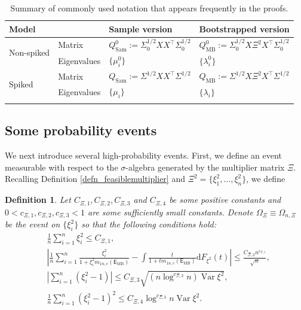 \documentclass[12pt]{article}
\theoremstyle{plain}
\newtheorem{definition}{Definition}[section]
\numberwithin{equation}{section}
\begin{document}
\begin{table}[!ht]
	\centering
	\captionsetup{justification=centering,singlelinecheck=true}
	\begin{tabular}{llll}
		\toprule
		Model           &   &Sample version & Bootstrapped version\\ \midrule
		\multirow{2}{*}{Non-spiked} & Matrix & $Q_{\mathrm{Sam}}^0:=\Sigma_0^{1/2}XX^\top \Sigma_0^{1/2}$ & $Q_{\mathrm{MB}}^0:=\Sigma_0^{1/2}X\Xi^2X^\top\Sigma_0^{1/2}$\\ \cmidrule(l){3-4} 
		& Eigenvalues & $\{\mu^0_i\}$ &  $\{\lambda^0_i\}$ \\ \midrule
		\multirow{2}{*}{Spiked} &Matrix & $Q_{\mathrm{Sam}}:=\Sigma^{1/2}XX^\top\Sigma^{1/2}$ & $Q_{\mathrm{MB}}:=\Sigma^{1/2}X\Xi^2X^\top\Sigma^{1/2}$  \\ \cmidrule(l){3-4}
		& Eigenvalues & $\{\mu_i\}$ & $\{\lambda_i\}$\\\bottomrule              \vspace{0.2pt}
	\end{tabular}
	\caption{Summary of commonly used notation that appears frequently in the proofs.}\label{table_notations}
\end{table}

\subsection{Some probability events}
We next introduce several high-probability events. First, we define an event measurable with respect to the $\sigma$-algebra generated by the multiplier matrix $\Xi$. Recalling Definition \ref{defn_feasiblemultiplier} and $\Xi^2=\{\xi^2_1,\dots,\xi^2_n\}$, we define
\begin{definition}\label{def_OmegaM}
	Let $C_{\Xi,1}, C_{\Xi,2}, C_{\Xi,3}$ and $C_{\Xi,4}$  be some positive constants and $0<c_{\Xi,1},c_{\Xi,2}, c_{\Xi,3}<1$ are some sufficiently small constants. Denote $\Omega_\Xi\equiv\Omega_{n,\Xi}$ be the event on $\{\xi^2_i\}$ so that the following conditions hold:
	\begin{align*}
		&\frac{1}{n}\sum_{i=1}^n\xi^2_i\leq C_{\Xi,1},\\
		&\left|\frac{1}{n}\sum_{i=1}^n\frac{\xi^2_i}{1+\xi^2_im_{1n,c}(\mathsf{E}_{\mathrm{MB}})}-\int\frac{t}{1+tm_{1n,c}(\mathsf{E}_{\mathrm{MB}})}\mathrm{d}F_{\xi^2}(t)\right|\leq \frac{C_{\Xi,2}n^{c_{\Xi,1}}}{\sqrt{n}},\\
		&\left|\sum_{i=1}^n(\xi^2_i-1)\right|\leq C_{\Xi,3}\sqrt{(n\log^{c_{\Xi,2}}n)\operatorname{Var}\xi^2},\\
		&\frac{1}{n}\sum_{i=1}^n(\xi^2_i-1)^2\leq C_{\Xi,4}\log^{c_{\Xi,3}}n\operatorname{Var}\xi^2.
	\end{align*}
\end{definition}
\end{document}
